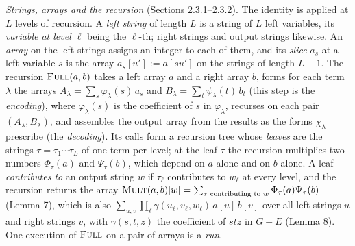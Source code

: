\documentclass[11pt]{article}
\theoremstyle{definition}
\theoremstyle{remark}
\newcommand{\Mult}{\textnormal{\textsc{Mult}}}
\newcommand{\Full}{\textnormal{\textsc{Full}}}
\begin{document}
\emph{Strings, arrays and the recursion} (Sections 2.3.1--2.3.2). The identity is applied at $L$ levels of recursion. A \emph{left string} of length $L$ is a string of $L$ left variables, its \emph{variable at level $\ell$} being the $\ell$-th; right strings and output strings likewise. An \emph{array} on the left strings assigns an integer to each of them, and its \emph{slice} $a_s$ at a left variable $s$ is the array $a_s[u']:=a[su']$ on the strings of length $L-1$. The recursion $\Full(a,b)$ takes a left array $a$ and a right array $b$, forms for each term $\lambda$ the arrays $A_\lambda=\sum_s\varphi_\lambda(s)\,a_s$ and $B_\lambda=\sum_t\psi_\lambda(t)\,b_t$ (this step is the \emph{encoding}), where $\varphi_\lambda(s)$ is the coefficient of $s$ in $\varphi_\lambda$, recurses on each pair $(A_\lambda,B_\lambda)$, and assembles the output array from the results as the forms $\chi_\lambda$ prescribe (the \emph{decoding}). Its calls form a recursion tree whose \emph{leaves} are the strings $\tau=\tau_1\cdots\tau_L$ of one term per level; at the leaf $\tau$ the recursion multiplies two numbers $\Phi_\tau(a)$ and $\Psi_\tau(b)$, which depend on $a$ alone and on $b$ alone. A leaf \emph{contributes to} an output string $w$ if $\tau_\ell$ contributes to $w_\ell$ at every level, and the recursion returns the array $\Mult(a,b)[w]=\sum_{\tau\text{ contributing to }w}\Phi_\tau(a)\Psi_\tau(b)$ (Lemma 7), which is also $\sum_{u,v}\prod_{\ell}\gamma(u_\ell,v_\ell,w_\ell)\,a[u]\,b[v]$ over all left strings $u$ and right strings $v$, with $\gamma(s,t,z)$ the coefficient of $stz$ in $G+E$ (Lemma 8). One execution of $\Full$ on a pair of arrays is a \emph{run}.
\end{document}
